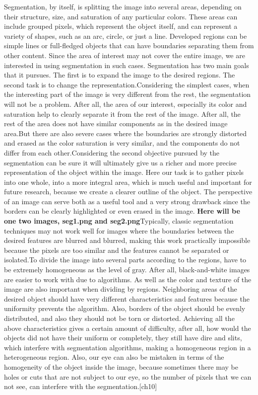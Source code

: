 \par  Segmentation, by itself, is splitting the image into several areas, depending on their structure, size, and saturation of any particular colors. These areas can include grouped pixels, which represent the object itself, and can represent a variety of shapes, such as an arc, circle, or just a line. Developed regions can be simple lines or full-fledged objects that can have boundaries separating them from other content. Since the area of interest may not cover the entire image, we are interested in using segmentation in such cases. Segmentation has two main goals that it pursues. The first is to expand the image to the desired regions. The second task is to change the representation.Considering the simplest cases, when the interesting part of the image is very different from the rest, the segmentation will not be a problem. After all, the area of our interest, especially its color and saturation help to clearly separate it from the rest of the image. After all, the rest of the area does not have similar components as in the desired image area.But there are also severe cases where the boundaries are strongly distorted and erased as the color saturation is very similar, and the components do not differ from each other.Considering the second objective pursued by the segmentation can be sure it will ultimately give us a richer and more precise representation of the object within the image. Here our task is to gather pixels into one whole, into a more integral area, which is much useful and important for future research, because we create a clearer outline of the object. The perspective of an image can serve both as a useful tool and a very strong drawback since the borders can be clearly highlighted or even erased in the image. \textbf{Here will be one two images, seg1.png and seg2.png}Typically, classic segmentation techniques may not work well for images where the boundaries between the desired features are blurred and blurred, making this work practically impossible because the pixels are too similar and the features cannot be separated or isolated.To divide the image into several parts according to the regions, have to be extremely homogeneous as the level of gray. After all, black-and-white images are easier to work with due to algorithms. As well as the color and texture of the image are also important when dividing by regions. Neighboring areas of the desired object should have very different characteristics and features because the uniformity prevents the algorithm. Also, borders of the object should be evenly distributed, and also they should not be torn or distorted. Achieving all the above characteristics gives a certain amount of difficulty, after all, how would the objects did not have their uniform or completely, they still have dire and slits, which interfere with segmentation algorithms, making a homogeneous region in a heterogeneous region. Also, our eye can also be mistaken in terms of the homogeneity of the object inside the image, because sometimes there may be holes or cuts that are not subject to our eye, so the number of pixels that we can not see, can interfere with the segmentation.[ch10]


